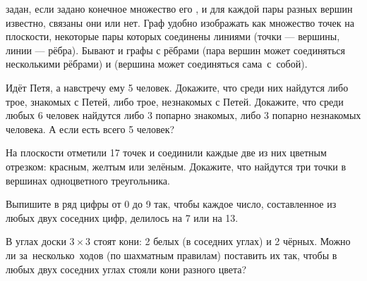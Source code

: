 \documentclass[a4paper,11pt]{article}
\begin{document}

\vspace*{-1truemm}
 задан, если задано конечное множество его ,
и для каждой пары разных вершин известно, связаны они 
или нет. Граф удобно изображать как множество точек на плоскости,
некоторые пары которых соединены линиями
(точки --- вершины, линии --- р\"ебра).
Бывают и графы с  рёбрами
(пара вершин может соединяться несколькими рёбрами)
и  (вершина может соединяться сама~с~собой).



Ид\"ет Петя,  а навстречу  ему 5 человек.
Докажите, что среди них найдутся либо трое,
знакомых с Петей, либо трое, незнакомых с Петей.
Докажите, что среди любых 6 человек найдутся
либо 3 попарно знакомых, либо 3 попарно незнакомых человека.
А если есть всего 5 человек?

На плоскости отметили 17 точек и соединили каждые две из них
цветным отрезком: красным, желтым или зел\"еным.
Докажите, что
найдутся три точки в вершинах одноцветного треугольника.

Выпишите в ряд цифры от 0 до 9 так, чтобы каждое число, составленное из
любых двух соседних цифр, делилось на 7 или на 13.


В углах доски $3\times3$ стоят кони: 2 белых (в соседних
углах) и 2 чёрных. Можно ли за~\hbox{несколько}~ходов (по шахматным
правилам) поставить их так, чтобы в любых двух
соседних углах
стояли кони разного цвета?
\end{document}
